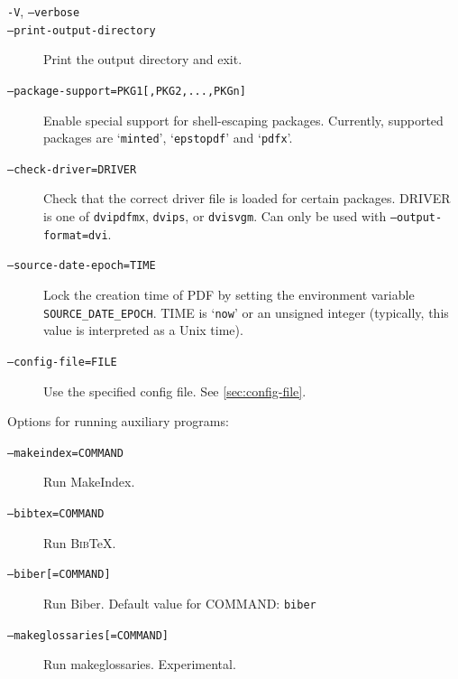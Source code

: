 \documentclass[a4paper]{report}
\providecommand\BibTeX{\textsc{Bib}\TeX}
\newcommand\metavar[1]{\textnormal{\textsf{#1}}}
\begin{document}
\begin{description}
\item[\texttt{-V}, \texttt{--verbose}]
\item[\texttt{--print-output-directory}]
  Print the output directory and exit.
\item[\texttt{--package-support=PKG1[,PKG2,...,PKGn]}]
  Enable special support for shell-escaping packages.
  Currently, supported packages are `\texttt{minted}', `\texttt{epstopdf}' and `\texttt{pdfx}'.
\item[\texttt{--check-driver=DRIVER}]
  Check that the correct driver file is loaded for certain packages.
  \metavar{DRIVER} is one of \texttt{dvipdfmx}, \texttt{dvips}, or \texttt{dvisvgm}.
  Can only be used with \texttt{--output-format=dvi}.
\item[\texttt{--source-date-epoch=TIME}]
  Lock the creation time of PDF by setting the environment variable \texttt{SOURCE\_DATE\_EPOCH}.
  \metavar{TIME} is `\texttt{now}' or an unsigned integer (typically, this value is interpreted as a Unix time).
\item[\texttt{--config-file=FILE}]
  Use the specified config file. See \autoref{sec:config-file}.
\end{description}

Options for running auxiliary programs:
\begin{description}
\item[\texttt{--makeindex=\metavar{COMMAND}}]
  Run MakeIndex.
\item[\texttt{--bibtex=\metavar{COMMAND}}]
  Run \BibTeX.
\item[\texttt{--biber[=\metavar{COMMAND}]}]
  Run Biber. Default value for \metavar{COMMAND}: \texttt{biber}
\item[\texttt{--makeglossaries[=\metavar{COMMAND}]}]
  Run makeglossaries. Experimental.
\end{description}
\end{document}
